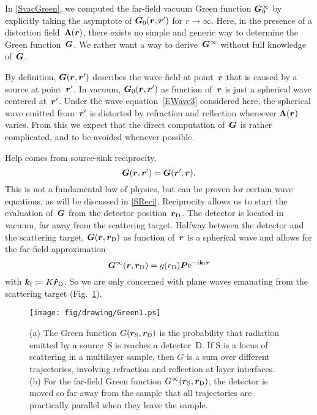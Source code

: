 In \cref{SvacGreen}, we computed the far-field vacuum Green function $\bm{G}_0^\infty$
by explicitly taking the asymptote of $\bm{G}_0(\bm{r},\bm{r}')$ for $r\to\infty$.
Here, in the presence of a distortion field~$\bm{\Lambda}(\bm{r})$,
there exists no simple and generic way to determine the Green function~$\bm{G}$.
We rather want a way to derive~$\bm{G}^\infty$ without full knowledge of~$\bm{G}$.

By definition, $\bm{G}(\bm{r},\bm{r}')$ describes the wave field at point~$\bm{r}$
that is caused by a source at point~$\bm{r}'$.
In vacuum,
$\bm{G}_0(\bm{r},\bm{r}')$ as function of~$\bm{r}$
is just a spherical wave centered at~$\bm{r}'$.
Under the wave equation~\cref{EWave3} considered here,
the spherical wave emitted from~$\bm{r}'$
is distorted by refraction and reflection whereever $\bm{\Lambda}(\bm{r})$ varies.
From this we expect that the direct computation of~$\bm{G}$
is rather complicated, and to be avoided whenever possible.

Help comes from source-sink reciprocity,
%
%
\begin{equation}\label{Erecip}
  \TG(\r,\r') = \TG(\r',\r).
\end{equation}
This is not a fundamental law of physics,
but can be proven for certain wave equations, as will be discussed in \cref{SReci}.
Reciprocity allows us to start the evaluation of~$\bm{G}$ from the detector position~$\bm{r}_\text{D}$.
The detector is located in vacuum, far away from the scattering target.
Halfway between the detector and the scattering target,
$\bm{G}(\bm{r},\bm{r}_\text{D})$ as function of~$\bm{r}$ is a spherical wave and
allows for the far-field approximation
\begin{equation}
  \bm{G}^\infty(\bm{r},\bm{r}_\text{D})
  = g(r_\text{D}) \bm{P}  \mathrm e^{-i{\bm{k}}_{\text{f}}\bm{r}}
\end{equation}
with ${\bm{k}}_{\text{f}}\coloneqq K \bm{\hat r}_\text{D}$.
So we are only concerned with plane waves emanating from the scattering target
(Fig.~\ref{Fgreen1}).

\begin{figure}[tb]
\begin{center}
\texttt{[image: fig/drawing/Green1.ps]}
\end{center}
\caption{(a)
The Green function $G(\bm{r}_\text{S},\bm{r}_\text{D})$
%
is the probability that radiation emitted
by a source~S is reaches a detector~D.
If S is a locus of scattering in a multilayer sample,
then $G$ is a sum over different trajectories,
involving refraction and reflection
at layer interfaces.
(b) For the far-field
%
Green function $G^\infty(\bm{r}_\text{S},\bm{r}_\text{D})$,
the detector is moved so far away from the sample
that all trajectories are practically parallel when they leave the sample.}
\label{Fgreen1}
\end{figure}

